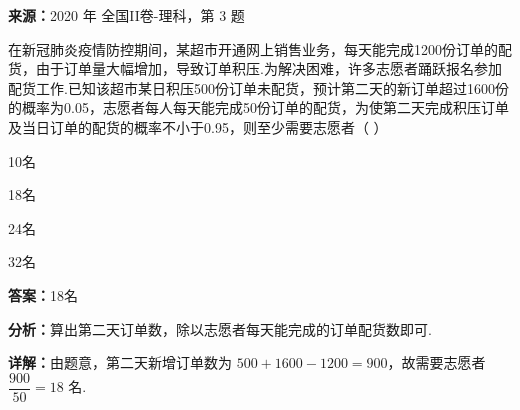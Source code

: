 \begin{question}[points=5]
\textbf{来源：}2020 年 全国II卷-理科，第 3 题\par
在新冠肺炎疫情防控期间，某超市开通网上销售业务，每天能完成1200份订单的配货，由于订单量大幅增加，导致订单积压.为解决困难，许多志愿者踊跃报名参加配货工作.已知该超市某日积压500份订单未配货，预计第二天的新订单超过1600份的概率为0.05，志愿者每人每天能完成50份订单的配货，为使第二天完成积压订单及当日订单的配货的概率不小于0.95，则至少需要志愿者（ ）
\begin{choices}
  \item 10名
  \item 18名
  \item 24名
  \item 32名
\end{choices}
\begin{solution}
\textbf{答案：}18名

\textbf{分析：}算出第二天订单数，除以志愿者每天能完成的订单配货数即可.

\textbf{详解：}由题意，第二天新增订单数为 $500+1600-1200=900$，故需要志愿者 $\dfrac{900}{50}=18$ 名.
\end{solution}
\end{question}

